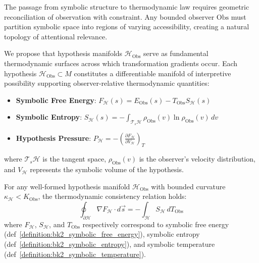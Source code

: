 \begin{scholium} 
\label{scholium:bk2_on_hypotheses_as_thermodyn}
The passage from symbolic structure to thermodynamic law requires geometric reconciliation of observation with constraint. Any bounded observer $\text{Obs}$ must partition symbolic space into regions of varying accessibility, creating a natural topology of attentional relevance.

We propose that hypothesis manifolds $\mathcal{H}_{\text{Obs}}$ serve as fundamental thermodynamic surfaces across which transformation gradients occur. Each hypothesis $\mathcal{H}_{\text{Obs}} \subset M$ constitutes a differentiable manifold of interpretive possibility supporting observer-relative thermodynamic quantities:

\begin{itemize}
    \item \textbf{Symbolic Free Energy}: $F_{\mathcal{H}}(s) = E_{\text{Obs}}(s) - T_{\text{Obs}} S_{\mathcal{H}}(s)$
    \item \textbf{Symbolic Entropy}: $S_{\mathcal{H}}(s) = -\int_{\mathcal{T}_s\mathcal{H}} \rho_{\text{Obs}}(v) \ln \rho_{\text{Obs}}(v) \, dv$
    \item \textbf{Hypothesis Pressure}: $P_{\mathcal{H}} = -\left(\frac{\partial F_{\mathcal{H}}}{\partial V_{\mathcal{H}}}\right)_{T}$
\end{itemize}

where $\mathcal{T}_s\mathcal{H}$ is the tangent space, $\rho_{\text{Obs}}(v)$ is the observer's velocity distribution, and $V_{\mathcal{H}}$ represents the symbolic volume of the hypothesis.
\end{scholium}

\begin{lemma} 
\label{lem:bk2_thermodynamic_consistency_hypothesis_manifolds}
For any well-formed hypothesis manifold $\mathcal{H}_{\text{Obs}}$ with bounded curvature $\kappa_{\mathcal{H}} < K_{\text{Obs}}$, the thermodynamic consistency relation holds:
\[
\oint_{\partial \mathcal{H}} \nabla F_{\mathcal{H}} \cdot d\vec{s} = -\int_{\mathcal{H}} S_{\mathcal{H}} \, dT_{\text{Obs}}
\]
where $F_{\mathcal{H}}$, $S_{\mathcal{H}}$, and $T_{\text{Obs}}$ respectively correspond to symbolic free energy (def~\ref{definition:bk2_symbolic_free_energy}), symbolic entropy (def~\ref{definition:bk2_symbolic_entropy}), and symbolic temperature (def~\ref{definition:bk2_symbolic_temperature}).
\end{lemma}

